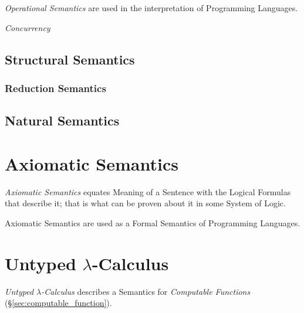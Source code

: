 \documentclass{article}
\begin{document}
\emph{Operational Semantics} are used in the interpretation of
Programming Languages.

\emph{Concurrency}

\subsection{Structural Semantics}

\subsubsection{Reduction Semantics}

\subsection{Natural Semantics}



\section{Axiomatic Semantics}

\emph{Axiomatic Semantics} equates Meaning of a Sentence with the
Logical Formulas that describe it; that is what can be proven about it
in some System of Logic.

Axiomatic Semantics are used as a Formal Semantics of Programming
Languages.



\section{Untyped $\lambda$-Calculus}\label{sec:untyped_lambda}

\emph{Untyped $\lambda$-Calculus} describes a Semantics for
\emph{Computable Functions} (\S\ref{sec:computable_function}).
\end{document}
